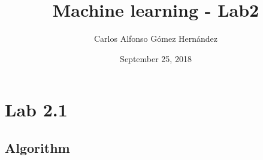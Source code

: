 \documentclass{article}
\title{Machine learning - Lab2}
\author{Carlos Alfonso Gómez Hernández}
\date{September 25, 2018}
\begin{document}
\maketitle

\section{Lab 2.1}
\subsection{Algorithm}
\end{document}

